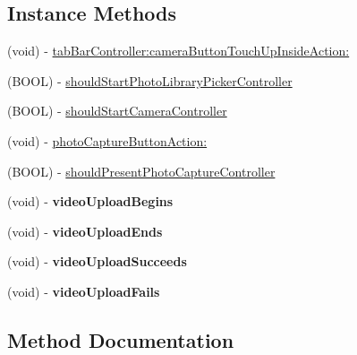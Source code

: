 \subsection*{Instance Methods}
\begin{DoxyCompactItemize}
\item 
(void) -\/ \hyperlink{protocol_e_s_tab_bar_controller_delegate-p_ae7f8355b161bba7153812bdced0a6e55}{tab\+Bar\+Controller\+:camera\+Button\+Touch\+Up\+Inside\+Action\+:}
\item 
(B\+O\+O\+L) -\/ \hyperlink{protocol_e_s_tab_bar_controller_delegate-p_aa4d65e1ff4ca24a644d03237c9d6edff}{should\+Start\+Photo\+Library\+Picker\+Controller}
\item 
(B\+O\+O\+L) -\/ \hyperlink{protocol_e_s_tab_bar_controller_delegate-p_a1b76c17284763e9cfe47944fbf30be97}{should\+Start\+Camera\+Controller}
\item 
(void) -\/ \hyperlink{protocol_e_s_tab_bar_controller_delegate-p_ab3f3db2a3f6f1f36afc116f2b0b000f3}{photo\+Capture\+Button\+Action\+:}
\item 
(B\+O\+O\+L) -\/ \hyperlink{protocol_e_s_tab_bar_controller_delegate-p_ac7fc5c9b28274b3a50b155d01d375a77}{should\+Present\+Photo\+Capture\+Controller}
\item 
\hypertarget{protocol_e_s_tab_bar_controller_delegate-p_a6cc649b38b4ea3ff8951c9b2dcb878c7}{}(void) -\/ {\bfseries video\+Upload\+Begins}\label{protocol_e_s_tab_bar_controller_delegate-p_a6cc649b38b4ea3ff8951c9b2dcb878c7}

\item 
\hypertarget{protocol_e_s_tab_bar_controller_delegate-p_a4f1ec8b21d0755d0ba6456b018681684}{}(void) -\/ {\bfseries video\+Upload\+Ends}\label{protocol_e_s_tab_bar_controller_delegate-p_a4f1ec8b21d0755d0ba6456b018681684}

\item 
\hypertarget{protocol_e_s_tab_bar_controller_delegate-p_a96f2e00c06b4d869718b526e9ab79c6c}{}(void) -\/ {\bfseries video\+Upload\+Succeeds}\label{protocol_e_s_tab_bar_controller_delegate-p_a96f2e00c06b4d869718b526e9ab79c6c}

\item 
\hypertarget{protocol_e_s_tab_bar_controller_delegate-p_a46bba8cc9545cd0e9f5c78114a85e531}{}(void) -\/ {\bfseries video\+Upload\+Fails}\label{protocol_e_s_tab_bar_controller_delegate-p_a46bba8cc9545cd0e9f5c78114a85e531}

\end{DoxyCompactItemize}


\subsection{Method Documentation}
\hypertarget{protocol_e_s_tab_bar_controller_delegate-p_ab3f3db2a3f6f1f36afc116f2b0b000f3}{}
